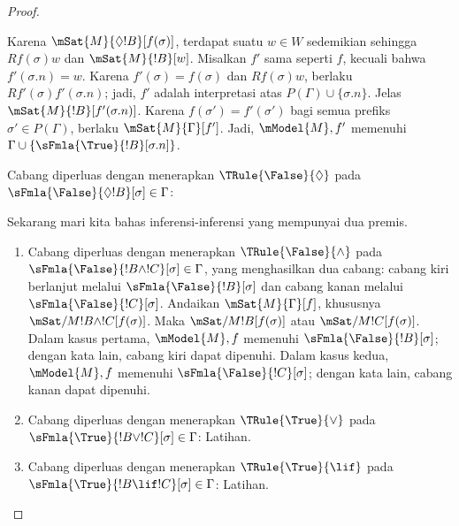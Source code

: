 \documentclass[../../../include/open-logic-section]{subfiles}
\begin{document}
\begin{proof}
\begin{enumerate}
{{  Karena $\mSat{M}{\Diamond !B}[f(\sigma)]$, terdapat suatu $w \in W$
  sedemikian sehingga $Rf(\sigma)w$ dan $\mSat{M}{!B}[w]$. Misalkan $f'$
  sama seperti $f$, kecuali bahwa $f'(\sigma.n) = w$. Karena
  $f'(\sigma) = f(\sigma)$ dan $Rf(\sigma)w$, berlaku
  $Rf'(\sigma)f'(\sigma.n)$; jadi, $f'$ adalah interpretasi atas
  $P(\Gamma) \cup \{\sigma.n\}$. Jelas
  $\mSat{M}{!B}[f'(\sigma.n)]$. Karena
  $f(\sigma') = f'(\sigma')$ bagi semua prefiks
  $\sigma' \in P(\Gamma)$, berlaku $\mSat{M}{\Gamma}[f']$. Jadi,
  $\mModel{M}, f'$ memenuhi
  $\Gamma \cup \{\sFmla{\True}{!B}[\sigma.n]\}$.}
\item Cabang diperluas dengan menerapkan $\TRule{\False}{\Diamond}$ pada
  $\sFmla{\False}{\Diamond !B}[\sigma] \in \Gamma$:
  }{}
\end{enumerate}
Sekarang mari kita bahas inferensi-inferensi yang mempunyai dua premis.
\begin{enumerate}
\item Cabang diperluas dengan menerapkan $\TRule{\False}{\land}$ pada
  $\sFmla{\False}{!B \land !C}[\sigma] \in \Gamma$, yang menghasilkan
  dua cabang: cabang kiri berlanjut melalui
  $\sFmla{\False}{!B}[\sigma]$ dan cabang kanan melalui
  $\sFmla{\False}{!C}[\sigma]$. Andaikan $\mSat{M}{\Gamma}[f]$,
  khususnya $\mSat/{M}{!B \land !C}[f(\sigma)]$. Maka
  $\mSat/{M}{!B}[f(\sigma)]$ atau $\mSat/{M}{!C}[f(\sigma)]$. Dalam kasus
  pertama, $\mModel{M}, f$ memenuhi $\sFmla{\False}{!B}[\sigma]$; dengan
  kata lain, cabang kiri dapat dipenuhi. Dalam kasus kedua, $\mModel{M}, f$
  memenuhi $\sFmla{\False}{!C}[\sigma]$; dengan kata lain, cabang kanan
  dapat dipenuhi.
\item Cabang diperluas dengan menerapkan $\TRule{\True}{\lor}$ pada
    $\sFmla{\True}{!B \lor !C}[\sigma] \in \Gamma$: Latihan.
\item Cabang diperluas dengan menerapkan $\TRule{\True}{\lif}$ pada
    $\sFmla{\True}{!B \lif !C}[\sigma] \in \Gamma$: Latihan.
\end{enumerate}
\end{proof}
\end{document}
